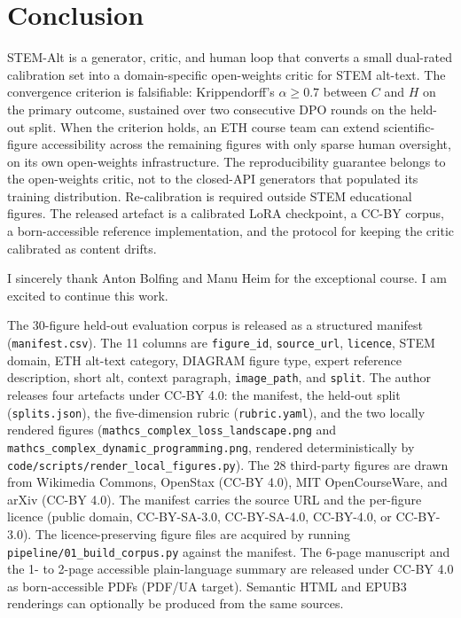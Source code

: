 \documentclass[pdflatex,sn-mathphys-num]{sn-jnl}
\begin{document}
\section{Conclusion}\label{sec:conclusion}

STEM-Alt is a generator, critic, and human loop that converts a small dual-rated calibration set into a domain-specific open-weights critic for STEM alt-text. The convergence criterion is falsifiable: Krippendorff's $\alpha \geq 0.7$ between $C$ and $H$ on the primary outcome, sustained over two consecutive DPO rounds on the held-out split. When the criterion holds, an ETH course team can extend scientific-figure accessibility across the remaining figures with only sparse human oversight, on its own open-weights infrastructure. The reproducibility guarantee belongs to the open-weights critic, not to the closed-API generators that populated its training distribution. Re-calibration is required outside STEM educational figures. The released artefact is a calibrated LoRA checkpoint, a CC-BY corpus, a born-accessible reference implementation, and the protocol for keeping the critic calibrated as content drifts.


I sincerely thank Anton Bolfing and Manu Heim for the exceptional course. I am excited to continue this work.


The 30-figure held-out evaluation corpus is released as a structured manifest (\texttt{manifest.csv}). The 11 columns are \texttt{figure\_id}, \texttt{source\_url}, \texttt{licence}, STEM domain, ETH alt-text category, DIAGRAM figure type, expert reference description, short alt, context paragraph, \texttt{image\_path}, and \texttt{split}. The author releases four artefacts under CC-BY 4.0: the manifest, the held-out split (\texttt{splits.json}), the five-dimension rubric (\texttt{rubric.yaml}), and the two locally rendered figures (\texttt{mathcs\_complex\_loss\_landscape.png} and \texttt{mathcs\_complex\_dynamic\_programming.png}, rendered deterministically by \texttt{code/scripts/render\_local\_figures.py}). The 28 third-party figures are drawn from Wikimedia Commons, OpenStax (CC-BY 4.0), MIT OpenCourseWare, and arXiv (CC-BY 4.0). The manifest carries the source URL and the per-figure licence (public domain, CC-BY-SA-3.0, CC-BY-SA-4.0, CC-BY-4.0, or CC-BY-3.0). The licence-preserving figure files are acquired by running \texttt{pipeline/01\_build\_corpus.py} against the manifest. The 6-page manuscript and the 1- to 2-page accessible plain-language summary are released under CC-BY 4.0 as born-accessible PDFs (PDF/UA target). Semantic HTML and EPUB3 renderings can optionally be produced from the same sources.
\end{document}
